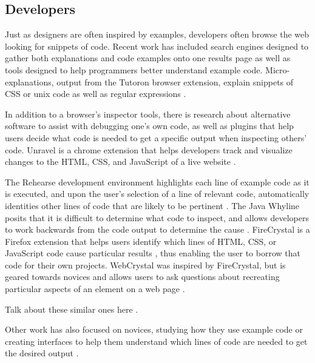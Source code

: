 \documentclass{sigchi}
\begin{document}
\subsection{Developers}
Just as designers are often inspired by examples, developers often browse the web looking for snippets of code. Recent work has included search engines designed to gather both explanations and code examples onto one results page \cite{assieme_web_search_for_programmers_Hoffmann_UIST_2007} as well as tools designed to help programmers better understand example code. Micro-explanations, output from the Tutoron browser extension, explain snippets of CSS or unix code as well as regular expressions \cite{Head_tutorons_generating_sketchy_no_conf_no_year}. 

In addition to a browser's inspector tools, there is research about alternative software to assist with debugging one's own code, as well as plugins that help users decide what code is needed to get a specific output when inspecting others' code. Unravel is a chrome extension that helps developers track and visualize changes to the HTML, CSS, and JavaScript of a live website \cite{unravel_rapid_web_app_reverse_engineering_Hibschman_UIST_2015}. 

The Rehearse development environment highlights each line of example code as it is executed, and upon the user's selection of a line of relevant code, automatically identities other lines of code that are likely to be pertinent \cite{rehearse_helping_programmers_adapt_examples_Brandt_ples_CSTR}. The Java Whyline posits that it is difficult to determine what code to inspect, and allows developers to work backwards from the code output to determine the cause \cite{java_whyline_Ko_CHI_2009}. FireCrystal is a Firefox extension that helps users identify which lines of HTML, CSS, or JavaScript code cause particular results \cite{firecrystal_oney_ieee_2013}, thus enabling the user to borrow that code for their own projects. WebCrystal was inspired by FireCrystal, but is geared towards novices and allows users to ask questions about recreating particular aspects of an element on a web page \cite{webcrystal_Chang_CHI_2012}. 

Talk about these similar ones here \cite{telescope_Hibschman_UIST_2016, augmented_web_rationales_opporunities_challenges_Diaz_tweb_2015, cracking_cocoa_nut_Eagan_UIST_2011, auto_and_customization_of_rendered_web_Bolin_UIST_2005}. 

Other work has also focused on novices, studying how they use example code \cite{exploring_novice_programmer_example_use_ichinco_iee_2015} or creating interfaces to help them understand which lines of code are needed to get the desired output \cite{dinah_non_programmers_coding_Gross_CHI_2011}. 
\end{document}
